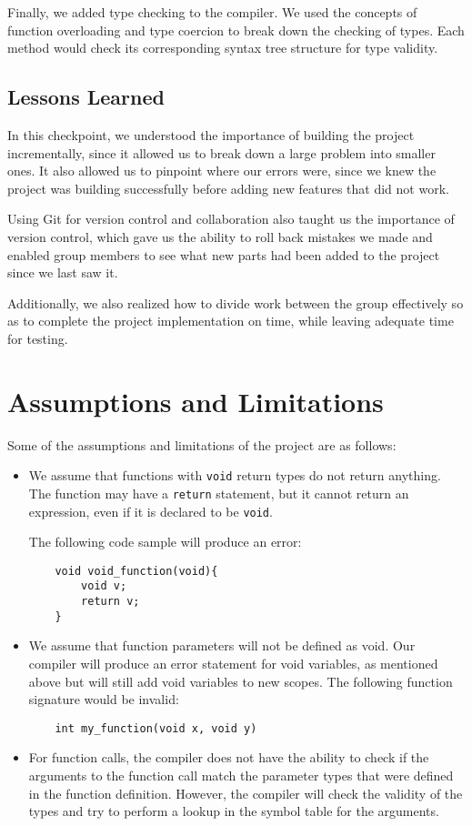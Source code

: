 \documentclass[12pt, letterpaper]{article}
\begin{document}
Finally, we added type checking to the compiler. We used the concepts of function overloading and type coercion to break down the checking of types. Each method would check its corresponding syntax tree structure for type validity.
 
\subsection{Lessons Learned}
In this checkpoint, we understood the importance of building the project incrementally, since it allowed us to break down a large problem into smaller ones. It also allowed us to pinpoint where our errors were, since we knew the project was building successfully before adding new features that did not work.

Using Git for version control and collaboration also taught us the importance of version control, which gave us the ability to roll back mistakes we made and enabled group members to see what new parts had been added to the project since we last saw it.

Additionally, we also realized how to divide work between the group effectively so as to complete the project implementation on time, while leaving adequate time for testing.

\section{Assumptions and Limitations}
Some of the assumptions and limitations of the project are as follows:
\begin{itemize}
\item We assume that functions with \texttt{void} return types do not return anything. The function may have a \texttt{return} statement, but it cannot return an expression, even if it is declared to be \texttt{void}. 

The following code sample will produce an error:
\begin{lstlisting}
	void void_function(void){
		void v;
		return v;
	}
\end{lstlisting}

\item We assume that function parameters will not be defined as void. Our compiler will produce an error statement for void variables, as mentioned above but will still add void variables to new scopes. The following function signature would be invalid:
\begin{lstlisting}
	int my_function(void x, void y)
\end{lstlisting}

\item For function calls, the compiler does not have the ability to check if the arguments to the function call match the parameter types that were defined in the function definition. However, the compiler will check the validity of the types and try to perform a lookup in the symbol table for the arguments.
\end{itemize}
\end{document}
